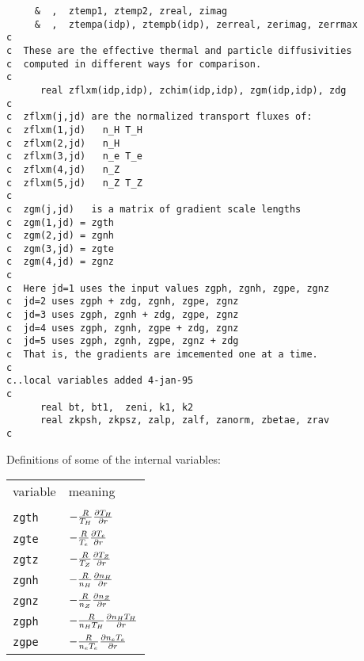 \begin{verbatim}
     &  ,  ztemp1, ztemp2, zreal, zimag
     &  ,  ztempa(idp), ztempb(idp), zerreal, zerimag, zerrmax
c
c  These are the effective thermal and particle diffusivities
c  computed in different ways for comparison.
c
      real zflxm(idp,idp), zchim(idp,idp), zgm(idp,idp), zdg
c
c  zflxm(j,jd) are the normalized transport fluxes of:
c  zflxm(1,jd)   n_H T_H
c  zflxm(2,jd)   n_H
c  zflxm(3,jd)   n_e T_e
c  zflxm(4,jd)   n_Z
c  zflxm(5,jd)   n_Z T_Z
c
c  zgm(j,jd)   is a matrix of gradient scale lengths
c  zgm(1,jd) = zgth
c  zgm(2,jd) = zgnh
c  zgm(3,jd) = zgte
c  zgm(4,jd) = zgnz
c
c  Here jd=1 uses the input values zgph, zgnh, zgpe, zgnz
c  jd=2 uses zgph + zdg, zgnh, zgpe, zgnz
c  jd=3 uses zgph, zgnh + zdg, zgpe, zgnz
c  jd=4 uses zgph, zgnh, zgpe + zdg, zgnz
c  jd=5 uses zgph, zgnh, zgpe, zgnz + zdg
c  That is, the gradients are imcemented one at a time.
c
c..local variables added 4-jan-95
c
      real bt, bt1,  zeni, k1, k2
      real zkpsh, zkpsz, zalp, zalf, zanorm, zbetae, zrav
c
\end{verbatim}

Definitions of some of the internal variables:

\renewcommand{\arraystretch}{1.4}
\begin{center}
\begin{tabular}{lp{4.0in}}
variable & meaning \\
\\
{\tt zgth} & $ - \frac{R}{T_H} \frac{\partial T_H}{\partial r} $ \\
{\tt zgte} & $ - \frac{R}{T_e} \frac{\partial T_e}{\partial r} $ \\
{\tt zgtz} & $ - \frac{R}{T_Z} \frac{\partial T_Z}{\partial r} $ \\
{\tt zgnh} & $ - \frac{R}{n_H} \frac{\partial n_H}{\partial r} $ \\
{\tt zgnz} & $ - \frac{R}{n_Z} \frac{\partial n_Z}{\partial r} $ \\
{\tt zgph} & $ - \frac{R}{n_H T_H} \frac{\partial n_H T_H}{\partial r} $ \\
{\tt zgpe} & $ - \frac{R}{n_e T_e} \frac{\partial n_e T_e}{\partial r} $ \\
\end{tabular}  \end{center}

